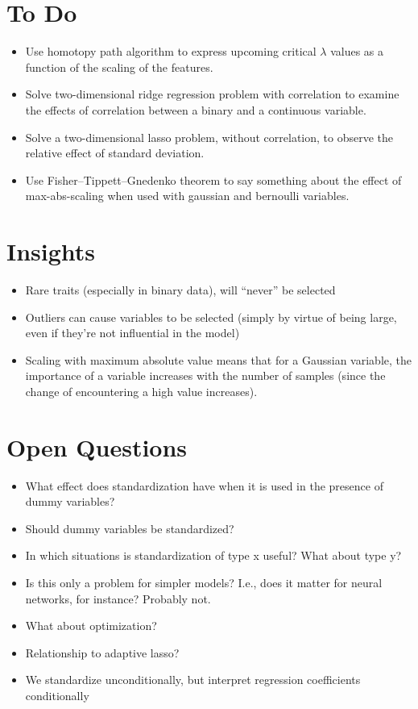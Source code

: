 \section{To Do}

\begin{itemize}
  \item Use homotopy path algorithm to express upcoming critical \(\lambda\) values as a function of the scaling of the features.
  \item Solve two-dimensional ridge regression problem with correlation to examine the effects of correlation between a binary and a continuous variable.
  \item Solve a two-dimensional lasso problem, without correlation, to observe the relative effect of standard deviation.
  \item Use Fisher–Tippett–Gnedenko theorem to say something about the effect of max-abs-scaling when used with gaussian and bernoulli variables.
\end{itemize}

\section{Insights}

\begin{itemize}
  \item Rare traits (especially in binary data), will ``never'' be selected
  \item Outliers can cause variables to be selected (simply by virtue of being large, even if they're not influential in the model)
  \item Scaling with maximum absolute value means that for a Gaussian variable, the importance of a variable increases with the number of samples (since the change of encountering a high value increases).
\end{itemize}

\section{Open Questions}

\begin{itemize}
  \item What effect does standardization have when it is used in the presence of dummy variables?
  \item Should dummy variables be standardized?
  \item In which situations is standardization of type x useful? What about type y?
  \item Is this only a problem for simpler models? I.e., does it matter for neural networks, for instance? Probably not.
  \item What about optimization?
  \item Relationship to adaptive lasso?
  \item We standardize unconditionally, but interpret regression coefficients conditionally
\end{itemize}




